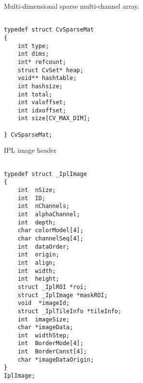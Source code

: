 \label{CvSparseMat}

Multi-dimensional sparse multi-channel array.

\begin{lstlisting}

typedef struct CvSparseMat
{
    int type;
    int dims; 
    int* refcount; 
    struct CvSet* heap; 
    void** hashtable; 
    int hashsize;
    int total; 
    int valoffset; 
    int idxoffset; 
    int size[CV_MAX_DIM]; 

} CvSparseMat;

\end{lstlisting}

\begin{description}
\end{description}

\label{IplImage}

IPL image header

\begin{lstlisting}

typedef struct _IplImage
{
    int  nSize;         
    int  ID;            
    int  nChannels;     
    int  alphaChannel;  
    int  depth;         
    char colorModel[4]; 
    char channelSeq[4]; 
    int  dataOrder;     
    int  origin;        
    int  align;         
    int  width;         
    int  height;        
    struct _IplROI *roi; 
    struct _IplImage *maskROI; 
    void  *imageId;     
    struct _IplTileInfo *tileInfo; 
    int  imageSize;                             
    char *imageData;  
    int  widthStep;   
    int  BorderMode[4]; 
    int  BorderConst[4]; 
    char *imageDataOrigin; 
}
IplImage;

\end{lstlisting}

